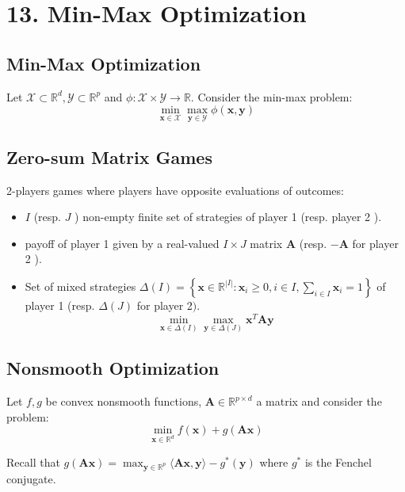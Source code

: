 \section*{13. Min-Max Optimization}



\subsection*{Min-Max Optimization}
Let $\mathcal{X} \subset \mathbb{R}^{d}, \mathcal{Y} \subset \mathbb{R}^{p}$ and $\phi: \mathcal{X} \times \mathcal{Y} \rightarrow \mathbb{R}$. Consider the min-max problem:
$$
\min _{\mathbf{x} \in \mathcal{X}} \max _{\mathbf{y} \in \mathcal{Y}} \phi(\mathbf{x}, \mathbf{y})
$$



\subsection*{Zero-sum Matrix Games}
2-players games where players have opposite evaluations of outcomes:
\begin{itemize}[leftmargin=*]
    \item $I$ (resp. $J$ ) non-empty finite set of strategies of player 1 (resp. player 2 ).
    \item payoff of player 1 given by a real-valued $I \times J$ matrix $\mathbf{A}$ (resp. $-\mathbf{A}$ for player 2 ).
    \item Set of mixed strategies $\Delta(I)=\left\{\mathbf{x} \in \mathbb{R}^{|I|}: \mathbf{x}_{i} \geq 0, i \in I, \sum_{i \in I} \mathbf{x}_{i}=1\right\}$ of player 1 (resp. $\Delta(J)$ for player 2$)$.
    $$\min _{\mathbf{x} \in \Delta(I)} \max _{\mathbf{y} \in \Delta(J)} \mathbf{x}^{T} \mathbf{A} \mathbf{y}$$
\end{itemize}



\subsection*{Nonsmooth Optimization}
Let $f, g$ be convex nonsmooth functions, $\mathbf{A} \in \mathbb{R}^{p \times d}$ a matrix and consider the problem:
$$
\min _{\mathbf{x} \in \mathbb{R}^{d}} f(\mathbf{x})+g(\mathbf{A} \mathbf{x})
$$

Recall that $g(\mathbf{A} \mathbf{x})=\max _{\mathbf{y} \in \mathbb{R}^{p}}\langle\mathbf{A} \mathbf{x}, \mathbf{y}\rangle-g^{*}(\mathbf{y})$ where $g^{*}$ is the Fenchel conjugate.

